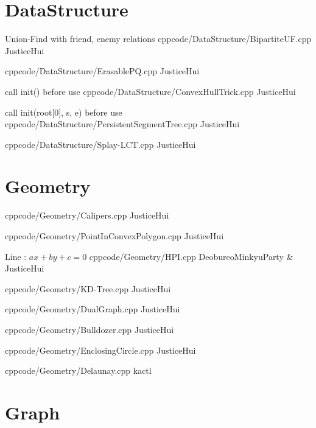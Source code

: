 \documentclass[landscape, 8pt, a4paper, oneside, twocolumn]{extarticle}
\begin{document}
\maketitlepage

\pagebreak 

\section{DataStructure}

{Union-Find with friend, enemy relations}{}
{cpp}{code/DataStructure/BipartiteUF.cpp}
{JusticeHui}

{}{}
{cpp}{code/DataStructure/ErasablePQ.cpp}
{JusticeHui}

{call init() before use}{}
{cpp}{code/DataStructure/ConvexHullTrick.cpp}
{JusticeHui}

{call init(root[0], s, e) before use}{}
{cpp}{code/DataStructure/PersistentSegmentTree.cpp}
{JusticeHui}

{}{}
{cpp}{code/DataStructure/Splay-LCT.cpp}
{JusticeHui}

\section{Geometry}

{}{}
{cpp}{code/Geometry/Calipers.cpp}
{JusticeHui}

{}{}
{cpp}{code/Geometry/PointInConvexPolygon.cpp}
{JusticeHui}

{Line : $ax + by + c = 0$}{}
{cpp}{code/Geometry/HPI.cpp}
{DeobureoMinkyuParty & JusticeHui}

{}{}
{cpp}{code/Geometry/KD-Tree.cpp}
{JusticeHui}

{}{}
{cpp}{code/Geometry/DualGraph.cpp}
{JusticeHui}

{}{}
{cpp}{code/Geometry/Bulldozer.cpp}
{JusticeHui}

{}{}
{cpp}{code/Geometry/EnclosingCircle.cpp}
{JusticeHui}

{}{}
{cpp}{code/Geometry/Delaunay.cpp}
{kactl}

\section{Graph}
\end{document}
